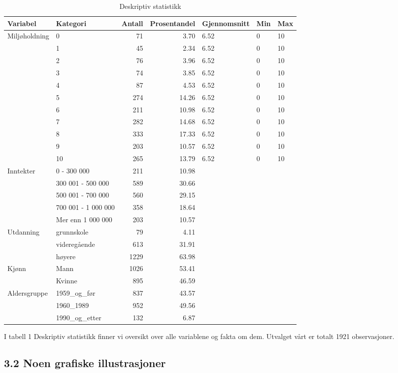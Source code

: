 \documentclass[
  12pt,
  letterpaper,
  DIV=11,
  numbers=noendperiod]{scrartcl}
\begin{document}
\begin{longtable}[t]{llrrlll}
\caption{Deskriptiv statistikk}\\
\toprule
Variabel & Kategori & Antall & Prosentandel & Gjennomsnitt & Min & Max\\
\midrule
Miljøholdning & 0 & 71 & 3.70 & 6.52 & 0 & 10\\
 & 1 & 45 & 2.34 & 6.52 & 0 & 10\\
 & 2 & 76 & 3.96 & 6.52 & 0 & 10\\
 & 3 & 74 & 3.85 & 6.52 & 0 & 10\\
 & 4 & 87 & 4.53 & 6.52 & 0 & 10\\
\addlinespace
 & 5 & 274 & 14.26 & 6.52 & 0 & 10\\
 & 6 & 211 & 10.98 & 6.52 & 0 & 10\\
 & 7 & 282 & 14.68 & 6.52 & 0 & 10\\
 & 8 & 333 & 17.33 & 6.52 & 0 & 10\\
 & 9 & 203 & 10.57 & 6.52 & 0 & 10\\
\addlinespace
 & 10 & 265 & 13.79 & 6.52 & 0 & 10\\
Inntekter & 0 - 300 000 & 211 & 10.98 &  &  & \\
 & 300 001 - 500 000 & 589 & 30.66 &  &  & \\
 & 500 001 - 700 000 & 560 & 29.15 &  &  & \\
 & 700 001 - 1 000 000 & 358 & 18.64 &  &  & \\
\addlinespace
 & Mer enn 1 000 000 & 203 & 10.57 &  &  & \\
Utdanning & grunnskole & 79 & 4.11 &  &  & \\
 & videregående & 613 & 31.91 &  &  & \\
 & høyere & 1229 & 63.98 &  &  & \\
Kjønn & Mann & 1026 & 53.41 &  &  & \\
\addlinespace
 & Kvinne & 895 & 46.59 &  &  & \\
Aldersgruppe & 1959\_og\_før & 837 & 43.57 &  &  & \\
 & 1960\_1989 & 952 & 49.56 &  &  & \\
 & 1990\_og\_etter & 132 & 6.87 &  &  & \\
\bottomrule
\end{longtable}

I tabell 1 Deskriptiv statistikk finner vi oversikt over alle variablene
og fakta om dem. Utvalget vårt er totalt 1921 observasjoner.

\hypertarget{noen-grafiske-illustrasjoner}{%
\subsection{3.2 Noen grafiske
illustrasjoner}\label{noen-grafiske-illustrasjoner}}
\end{document}
